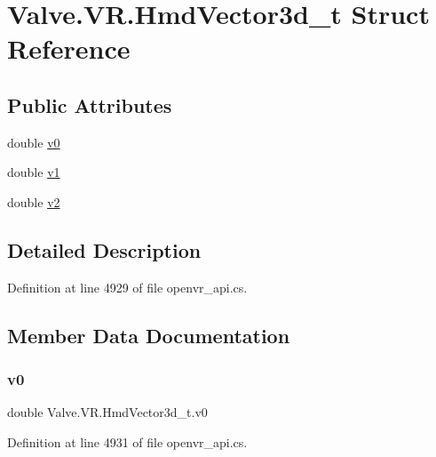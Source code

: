 \hypertarget{struct_valve_1_1_v_r_1_1_hmd_vector3d__t}{}\section{Valve.\+V\+R.\+Hmd\+Vector3d\+\_\+t Struct Reference}
\label{struct_valve_1_1_v_r_1_1_hmd_vector3d__t}
\subsection*{Public Attributes}
\begin{DoxyCompactItemize}
\item 
double \mbox{\hyperlink{struct_valve_1_1_v_r_1_1_hmd_vector3d__t_ad0f5b962ec00031215b32abbda34aa34}{v0}}
\item 
double \mbox{\hyperlink{struct_valve_1_1_v_r_1_1_hmd_vector3d__t_aee024ba196c1cee4cf612a80d62262ba}{v1}}
\item 
double \mbox{\hyperlink{struct_valve_1_1_v_r_1_1_hmd_vector3d__t_a352f2b52154988bcfb77e0b0d3bba5a8}{v2}}
\end{DoxyCompactItemize}


\subsection{Detailed Description}


Definition at line 4929 of file openvr\+\_\+api.\+cs.



\subsection{Member Data Documentation}
\mbox{\label{struct_valve_1_1_v_r_1_1_hmd_vector3d__t_ad0f5b962ec00031215b32abbda34aa34}} 
\subsubsection{\texorpdfstring{v0}{v0}}
{\footnotesize\ttfamily double Valve.\+V\+R.\+Hmd\+Vector3d\+\_\+t.\+v0}



Definition at line 4931 of file openvr\+\_\+api.\+cs.

\mbox{\label{struct_valve_1_1_v_r_1_1_hmd_vector3d__t_aee024ba196c1cee4cf612a80d62262ba}} 
